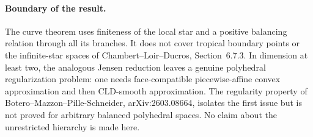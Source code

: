 \paragraph{Boundary of the result.}
The curve theorem uses finiteness of the local star and a positive balancing
relation through all its branches.  It does not cover tropical boundary
points or the infinite-star spaces of Chambert--Loir--Ducros, Section~6.7.3.
In dimension at least two, the analogous Jensen reduction leaves a genuine
polyhedral regularization problem: one needs face-compatible
piecewise-affine convex approximation and then CLD-smooth approximation.
The regularity property of Botero--Mazzon--Pille-Schneider,
arXiv:2603.08664, isolates the first issue but is not proved for arbitrary
balanced polyhedral spaces.  No claim about the unrestricted hierarchy is
made here.
